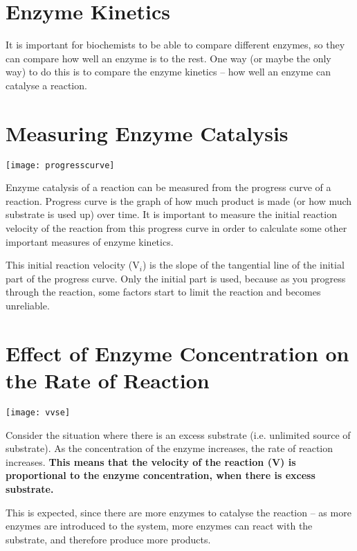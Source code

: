 \section{Enzyme Kinetics}

It is important for biochemists to be able to compare different enzymes, so they can compare how well an enzyme is to the rest.
One way (or maybe the only way) to do this is to compare the enzyme kinetics -- how well an enzyme can catalyse a reaction.

\section{Measuring Enzyme Catalysis}

\begin{center}
\texttt{[image: progresscurve]}
\end{center}

Enzyme catalysis of a reaction can be measured from the progress curve of a reaction.
Progress curve is the graph of how much product is made (or how much substrate is used up) over time.
It is important to measure the initial reaction velocity of the reaction from this progress curve in order to calculate some other important measures of enzyme kinetics.

This initial reaction velocity (V$_i$) is the slope of the tangential line of the initial part of the progress curve.
Only the initial part is used, because as you progress through the reaction, some factors start to limit the reaction and becomes unreliable.

\section{Effect of Enzyme Concentration on the Rate of Reaction}

\begin{center}
\texttt{[image: vvse]}
\end{center}

Consider the situation where there is an excess substrate (i.e. unlimited source of substrate).
As the concentration of the enzyme increases, the rate of reaction increases.
\textbf{This means that the velocity of the reaction (V) is proportional to the enzyme concentration, when there is excess substrate.}

This is expected, since there are more enzymes to catalyse the reaction -- as more enzymes are introduced to the system, more enzymes can react with the substrate, and therefore produce more products.

